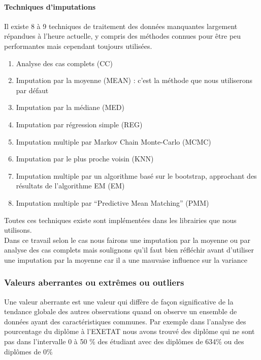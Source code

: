 \paragraph{Techniques  d'imputations} 

Il existe 8 à 9 techniques  de traitement des données manquantes
largement répandues à l'heure actuelle, y compris des méthodes connues
pour être peu performantes mais cependant toujours utilisées. 
\begin{enumerate}
	\item Analyse des cas complets (CC)
	\item Imputation par la moyenne (MEAN) : c'est la
	méthode que nous utiliserons par défaut
	\item Imputation par la médiane
	(MED)
	\item  Imputation par régression simple (REG)
	\item Imputation multiple par Markov Chain Monte-Carlo (MCMC)
	\item  Imputation par le plus proche
	voisin (KNN)
	\item Imputation multiple par un algorithme basé sur le
	bootstrap, approchant des résultats de l'algorithme EM (EM)
	\item Imputation multiple par ``Predictive Mean Matching'' (PMM)
\end{enumerate}
Toutes ces techniques existe sont implémentées dans les librairies que nous
utilisons.\\
Dans ce travail selon le cas nous fairons  une imputation par la
moyenne ou par analyse des cas complets mais soulignons qu'il faut bien
réfléchir avant d'utiliser une imputation par la moyenne car il a une
mauvaise influence sur la variance
\subsubsection{Valeurs aberrantes ou extrêmes ou outliers}
Une valeur aberrante est une valeur qui diffère de façon significative
de la tendance globale des autres observations quand on observe un
ensemble de données ayant des caractéristiques communes. Par exemple
dans l'analyse des pourcentage du diplôme à l'EXETAT nous avons trouvé
des diplôme qui ne sont pas dans l'intervalle 0 à 50 \% des étudiant
avec des diplômes de 634\% ou des diplômes de 0\%

